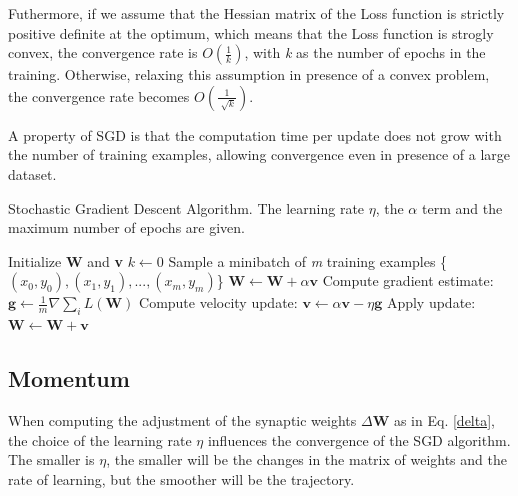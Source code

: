 		Futhermore, if we assume that the Hessian matrix of the Loss function is strictly positive definite at the optimum, which means that the Loss function is strogly convex, the convergence rate is $O(\frac{1}{k})$, with \textit{k} as the number of epochs in the training. %
		Otherwise, relaxing this assumption in presence of a convex problem, the convergence rate becomes $O(\frac{1}{\sqrt[]{k}})$\cite{Goodfellow-et-al-2016,Montavon:2012:NNT:2480981,Saad:1999:OLN:304710}.

		A property of SGD is that the computation time per update does not grow with the number of training examples, allowing convergence even in presence of a large dataset.

		\begin{algorithm}[H]
			\caption{Stochastic Gradient Descent Algorithm. The learning rate $\eta$, the $\alpha$ term and the maximum number of epochs are given.}
			\label{alg:sgd}
			\begin{algorithmic}[1]
					\State Initialize \textbf{W} and \textbf{v}
					\State $k \gets 0$
						\State Sample a minibatch of \textit{m} training examples \{\textit{$(x_0,y_0),(x_1,y_1),...,(x_m,y_m)$}\}
							\State $\textbf{W} \gets \textbf{W} + \alpha \textbf{v}$
						\EndIf
						\State Compute gradient estimate: $\textbf{g} \gets \frac {1}{m} \nabla \sum_i\textit{L}(\textbf{W})$
						\State Compute velocity update: $\textbf{v} \gets \alpha \textbf{v} - \eta \textbf{g}$
						\State Apply update: $\textbf{W} \gets \textbf{W} + \textbf{v}$
					\EndWhile
				\EndProcedure
			\end{algorithmic}
		\end{algorithm}


		\subsection{Momentum}
		\label{sec:momentum}
			When computing the adjustment of the synaptic weights $\Delta\textbf{W}$ as in Eq. \ref{delta}, the choice of the learning rate $\eta$ influences the convergence of the SGD algorithm.
			The smaller is $\eta$, the smaller will be the changes in the matrix of weights and the rate of learning, but the smoother will be the trajectory.

